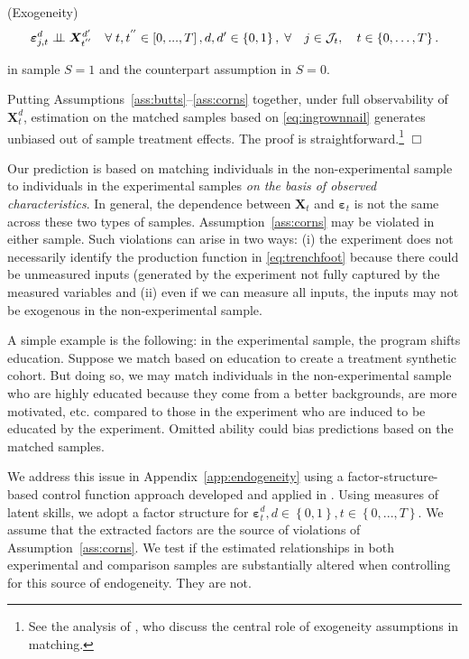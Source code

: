 \renewcommand\theassumption{A--\arabic{assumption}}
\begin{assumption}\label{ass:corns} (Exogeneity)
\begin{equation*}
\bm{\varepsilon}^d_{j,t} \perp\!\!\!\perp \bm{X}^{d^{\prime}}_{t^{''}} \quad \forall \; t,t^{''} \in \left[ 0,...,T \right], d,d^{\prime} \in \left\{ 0,1 \right\}, \; \forall \quad j \in \mathcal{J}_t, \quad t \in \left\{0,\dots,T\right\}.
\end{equation*}
\end{assumption}
\noindent in sample $S=1$ and the counterpart assumption in $S=0$.

\begin{theorem}
Putting Assumptions~\ref{ass:butts}--\ref{ass:corns} together, under full observability of $\bm{X}^d_t$, estimation on the matched samples based on \eqref{eq:ingrownnail} generates unbiased out of sample treatment effects. The proof is straightforward.\footnote{See the analysis of \citet{Heckman_Navarro_2004_REStat}, who discuss the central role of exogeneity assumptions in matching.} $\Box$
\end{theorem}

Our prediction is based on matching individuals in the non-experimental sample to individuals in the experimental samples \textit{on the basis of observed characteristics}. In general, the dependence between $\bm{X}_{t}$ and $\bm{\varepsilon}_{t}$ is not the same across these two types of samples. Assumption~\eqref{ass:corns} may be violated in either sample. Such violations can arise in two ways: (i) the experiment does not necessarily identify the production function in \eqref{eq:trenchfoot} because there could be unmeasured inputs (generated by the experiment not fully captured by the measured variables and (ii) even if we can measure all inputs, the inputs may not be exogenous in the non-experimental sample.

A simple example is the following: in the experimental sample, the program shifts education. Suppose we match based on education to create a treatment synthetic cohort. But doing so, we may match individuals in the non-experimental sample who are highly educated because they come from a better backgrounds, are more motivated, etc. compared to those in the experiment who are induced to be educated by the experiment. Omitted ability could bias predictions based on the matched samples.

We address this issue in Appendix~\ref{app:endogeneity} using a factor-structure-based control function approach developed and applied in \citet{Heckman_Pinto_etal_2013_PerryFactor}. Using measures of latent skills, we adopt a factor structure for $\bm{\varepsilon}^d_t, d \in \left\{0,1\right\}, t \in \left\{0,...,T\right\}$. We assume that the extracted factors are the source of violations of Assumption~\eqref{ass:corns}. We test if the estimated relationships  in both experimental and comparison samples are substantially altered when controlling for this source of endogeneity. They are not. 

